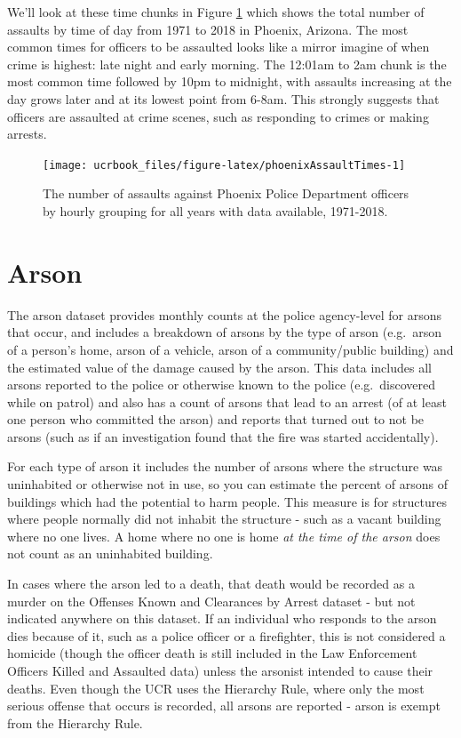 \documentclass[
  12pt,
  openany]{book}
\begin{document}
We'll look at these time chunks in Figure \ref{fig:phoenixAssaultTimes} which shows the total number of assaults by time of day from 1971 to 2018 in Phoenix, Arizona. The most common times for officers to be assaulted looks like a mirror imagine of when crime is highest: late night and early morning. The 12:01am to 2am chunk is the most common time followed by 10pm to midnight, with assaults increasing at the day grows later and at its lowest point from 6-8am. This strongly suggests that officers are assaulted at crime scenes, such as responding to crimes or making arrests.

\begin{figure}

{\centering \texttt{[image: ucrbook\_files/figure-latex/phoenixAssaultTimes-1]} 

}

\caption{The number of assaults against Phoenix Police Department officers by hourly grouping for all years with data available, 1971-2018.}\label{fig:phoenixAssaultTimes}
\end{figure}

\hypertarget{arson-1}{%
\chapter{Arson}\label{arson-1}}

The arson dataset provides monthly counts at the police agency-level for arsons that occur, and includes a breakdown of arsons by the type of arson (e.g.~arson of a person's home, arson of a vehicle, arson of a community/public building) and the estimated value of the damage caused by the arson. This data includes all arsons reported to the police or otherwise known to the police (e.g.~discovered while on patrol) and also has a count of arsons that lead to an arrest (of at least one person who committed the arson) and reports that turned out to not be arsons (such as if an investigation found that the fire was started accidentally).

For each type of arson it includes the number of arsons where the structure was uninhabited or otherwise not in use, so you can estimate the percent of arsons of buildings which had the potential to harm people. This measure is for structures where people normally did not inhabit the structure - such as a vacant building where no one lives. A home where no one is home \emph{at the time of the arson} does not count as an uninhabited building.

In cases where the arson led to a death, that death would be recorded as a murder on the Offenses Known and Clearances by Arrest dataset - but not indicated anywhere on this dataset. If an individual who responds to the arson dies because of it, such as a police officer or a firefighter, this is not considered a homicide (though the officer death is still included in the Law Enforcement Officers Killed and Assaulted data) unless the arsonist intended to cause their deaths. Even though the UCR uses the Hierarchy Rule, where only the most serious offense that occurs is recorded, all arsons are reported - arson is exempt from the Hierarchy Rule.
\end{document}

